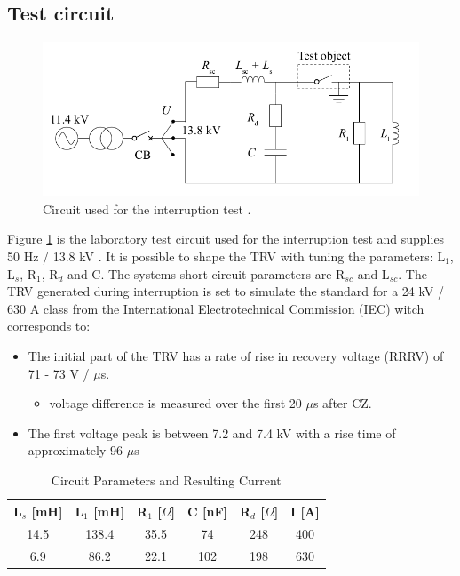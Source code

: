 \documentclass[10pt,a4paper]{article} %
\begin{document}
\subsection{Test circuit}

\begin{figure} [H]
\centering
\includegraphics[scale=0.3]{Bilder/Method/circuit.png}
\caption{Circuit used for the interruption test \cite{bib:AFIMVLBA}.} \label{fig:testCurcuit}
\end{figure}

Figure \ref{fig:testCurcuit} is the laboratory test circuit used for the interruption test and supplies 50 Hz / 13.8 kV . It is possible to shape the TRV with tuning the parameters: L$_1$, L$_s$, R$_1$, R$_d$ and C. The systems short circuit parameters are R$_{sc}$ and L$_{sc}$. The TRV generated during interruption is set to simulate the standard for a 24 kV / 630 A class from the International Electrotechnical Commission (IEC) witch corresponds to:

\begin{itemize}
\item The initial part of the TRV has a rate of rise in recovery voltage (RRRV) of 71 - 73 V / $\mu$s.
	\begin{itemize}
		\item voltage difference is measured over the first 20 $\mu$s after CZ.
	\end{itemize}
\item The first voltage peak is between 7.2 and 7.4 kV with a rise time of approximately 96 $\mu$s
\end{itemize}

\begin{table}[H]
\center
\caption{Circuit Parameters and Resulting Current \cite{bib:AFIMVLBA} }
\begin{tabular}{|c|c|c|c|c|c|}
\hline 
L$_s$ [mH] & L$_1$ [mH] & R$_1$ [$\Omega$] & C [nF] & R$_{d}$ [$\Omega$] & I [A] \\ 
\hline 
14.5 & 138.4 & 35.5 & 74 & 248 & 400 \\ 
\hline 
6.9 & 86.2 & 22.1 & 102 & 198 & 630 \\ 
\hline 
\end{tabular} 
\label{tab:testParameters}
\end{table}
\end{document}
